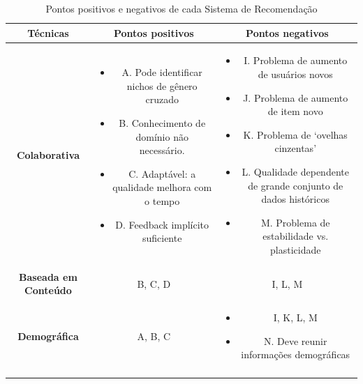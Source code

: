 \begin{table}[]
	\centering
	\caption{Pontos positivos e negativos de cada Sistema de Recomendação}
	\label{tab03}
	\begin{tabular}{|c|c|c|}
	\hline
	\rowcolor[HTML]{C0C0C0} 
	\textbf{Técnicas} & \textbf{Pontos positivos } & \textbf{Pontos negativos}  \\ \hline
	\textbf{Colaborativa} & \begin{minipage} [t] {0.3\textwidth} \begin{itemize} \item 	A. Pode identificar nichos de gênero cruzado \item B. Conhecimento de domínio não necessário. \item C. Adaptável: a qualidade melhora com o tempo \item D. Feedback implícito suficiente \end{itemize} \end{minipage} & \begin{minipage} [t] {0.3\textwidth} \begin{itemize} \item	I. Problema de aumento de usuários novos \item J. Problema de aumento de item novo \item K. Problema de ‘ovelhas cinzentas’ \item L. Qualidade dependente de grande conjunto de dados históricos \item M. Problema de estabilidade vs. plasticidade\end{itemize} \end{minipage}  \\ \hline
	\rowcolor[HTML]{EFEFEF} 
	\textbf{Baseada em Conteúdo} & B, C, D & I, L, M \\ \hline
	\textbf{Demográfica} & A, B, C  & \begin{minipage} [t] {0.3\textwidth} \begin{itemize} \item I, K, L, M \item N. Deve reunir informações demográficas\end{itemize} \end{minipage} \\ \hline
	\rowcolor[HTML]{EFEFEF} 

\end{tabular}
\end{table}
